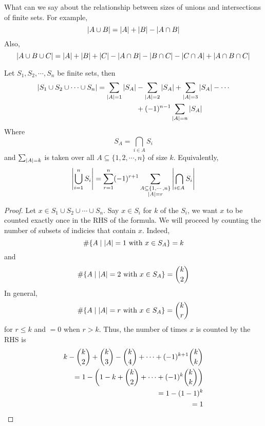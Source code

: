 \documentclass{article}
\begin{document}
\begin{question}
    What can we say about the relationship between sizes of unions and intersections of finite sets.
    For example,
    \[
        \left\lvert A \cup B\right\rvert = \left\lvert A\right\rvert + \left\lvert B\right\rvert - \left\lvert A \cap B\right\rvert  
    \]
    Also,
    \[
        \left\lvert A \cup B \cup C\right\rvert = \left\lvert A\right\rvert + \left\lvert B\right\rvert + \left\lvert C\right\rvert - \left\lvert A \cap B\right\rvert - \left\lvert B \cap C\right\rvert- \left\lvert C \cap A\right\rvert + \left\lvert A \cap B \cap C\right\rvert  
    \]
\end{question}

\begin{nthm}\label{th:4-4}
    Let $S_1, S_2, \cdots, S_n$ be finite sets, then
    \begin{align*}
        \left\lvert S_1 \cup S_2 \cup \cdots \cup S_n\right\rvert = \sum_{\left\lvert A\right\rvert = 1} \left\lvert S_A\right\rvert &- \sum_{\left\lvert A\right\rvert = 2} \left\lvert S_A\right\rvert + \sum_{\left\lvert A\right\rvert = 3} \left\lvert S_A\right\rvert - \cdots \\ 
        &+ (-1)^{n-1} \sum_{\left\lvert A\right\rvert = n} \left\lvert S_A\right\rvert
    \end{align*}
    Where
    \[
        S_A = \bigcap_{i \in A} S_i  
    \]
    and $\sum_{\left\lvert A\right\rvert = k}$ is taken over all $A \subseteq \{1, 2, \cdots, n\}$ of size $k$.
    Equivalently,
    \[
        \left\lvert \bigcup_{i=1}^n S_i\right\rvert = \sum_{r = 1}^n (-1)^{r + 1} \sum_{\substack{
            A \subseteq \{1, \cdots, n\} \\ 
            \left\lvert A\right\rvert = r
        }} \left\lvert \bigcap_{i \in A} S_i\right\rvert 
    \]
\end{nthm}
\begin{proof}
    Let $x \in S_1 \cup S_2 \cup \cdots \cup S_n$. 
    Say $x \in S_i$ for $k$ of the $S_i$, we want $x$ to be counted exactly once in the RHS of the formula.
    We will proceed by counting the number of subsets of indicies that contain $x$.
    Indeed,
    \[
        \#\{A \mid \left\lvert A\right\rvert = 1 \text{ with } x \in S_A\} = k  
    \]
    and
    \[
        \#\{A \mid \left\lvert A\right\rvert = 2 \text{ with } x \in S_A\} = \binom{k}{2}  
    \]
    In general,
    \[
        \#\{A \mid \left\lvert A\right\rvert = r \text{ with } x \in S_A\} = \binom{k}{r}
    \]
    for $r \leq k$ and $=0$ when $r > k$.
    Thus, the number of times $x$ is counted by the RHS is
    \begin{align*}
        k - \binom{k}{2} + \binom{k}{3} - \binom{k}{4} + \cdots + (-1)^{k+1} \binom{k}{k} \\
        = 1 - \left( 1 - k + \binom{k}{2} + \cdots + (-1)^k \binom{k}{k} \right) \\
        = 1 - (1 - 1)^k \\
        = 1
    \end{align*}
\end{proof}
\end{document}
